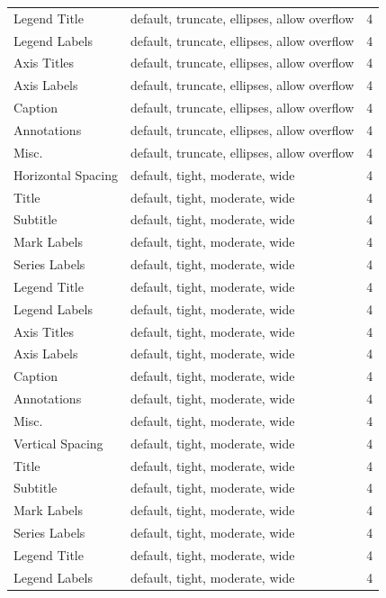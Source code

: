 \documentclass[12pt]{cmuthesis}
\begin{document}
{\begin{longtable}{@{}l p{7.2cm} r@{}}
\qquad Legend Title & default, truncate, ellipses, allow overflow & 4 \\
\qquad Legend Labels & default, truncate, ellipses, allow overflow & 4 \\
\qquad Axis Titles & default, truncate, ellipses, allow overflow & 4 \\
\qquad Axis Labels & default, truncate, ellipses, allow overflow & 4 \\
\qquad Caption & default, truncate, ellipses, allow overflow & 4 \\
\qquad Annotations & default, truncate, ellipses, allow overflow & 4 \\
\qquad Misc. & default, truncate, ellipses, allow overflow & 4 \\
\quad Horizontal Spacing & default, tight, moderate, wide & 4 \\
\qquad Title & default, tight, moderate, wide & 4 \\
\qquad Subtitle & default, tight, moderate, wide & 4 \\
\qquad Mark Labels & default, tight, moderate, wide & 4 \\
\qquad Series Labels & default, tight, moderate, wide & 4 \\
\qquad Legend Title & default, tight, moderate, wide & 4 \\
\qquad Legend Labels & default, tight, moderate, wide & 4 \\
\qquad Axis Titles & default, tight, moderate, wide & 4 \\
\qquad Axis Labels & default, tight, moderate, wide & 4 \\
\qquad Caption & default, tight, moderate, wide & 4 \\
\qquad Annotations & default, tight, moderate, wide & 4 \\
\qquad Misc. & default, tight, moderate, wide & 4 \\
\quad Vertical Spacing & default, tight, moderate, wide & 4 \\
\qquad Title & default, tight, moderate, wide & 4 \\
\qquad Subtitle & default, tight, moderate, wide & 4 \\
\qquad Mark Labels & default, tight, moderate, wide & 4 \\
\qquad Series Labels & default, tight, moderate, wide & 4 \\
\qquad Legend Title & default, tight, moderate, wide & 4 \\
\qquad Legend Labels & default, tight, moderate, wide & 4 \\

\end{longtable}}
\end{document}
